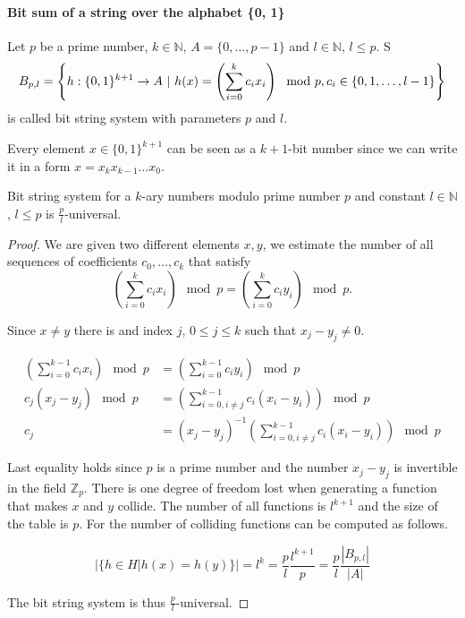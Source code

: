 \paragraph{Bit sum of a string over the alphabet \{0, 1\}}
\begin{definition}
Let $p$ be a prime number, $k \in \mathbb{N}$, $A = \{0, \dots, p - 1 \}$ and $l \in \mathbb{N}$, $l \leq p$. S 
\begin{displaymath}
B_{p, l} = \left\{ h: \{0, 1\}^{k + 1} \rightarrow A \ | \  h(x) = \left(\displaystyle \sum_{i=0}^{k} c_i x_i\right) \mod p, c_i \in \{0, 1, \dots, l - 1\} \right\}
\end{displaymath} 
is called bit string system with parameters $p$ and $l$.
\end{definition}

\begin{remark}
Every element $x \in \{0, 1\}^{k + 1}$ can be seen as a $k + 1$-bit number since we can write it in a form $x = x_k x_{k - 1} \dots x_0$. 
\end{remark}

\begin{remark}
Bit string system for a $k$-ary numbers modulo prime number $p$ and constant $l \in \mathbb{N}$, $l \leq p$ is $\frac{p}{l}$-universal.
\end{remark}
\begin{proof}
We are given two different elements $x, y$, we estimate the number of all sequences of coefficients $c_0, \dots, c_k$ that satisfy
\[
\left( \displaystyle \sum_{i = 0}^{k} c_i x_i \right) \mod p = \left( \displaystyle \sum_{i = 0}^{k} c_i y_i \right) \mod p \textit{.}
\]

Since $x \neq y$ there is and index $j$, $0 \leq j \leq k$ such that $x_j - y_j \neq 0$.

\begin{displaymath}
\begin{split}
\left(\displaystyle \sum_{i=0}^{k-1} c_i x_i\right) \mod p & = \left(\displaystyle \sum_{i=0}^{k-1} c_i y_i\right) \mod p \\
c_j(x_j - y_j) \mod p & = \left(\displaystyle \sum_{i=0, i \neq j}^{k-1} c_i (x_i - y_i)\right) \mod p \\
c_j & = (x_j - y_j) ^ {-1}\left(\displaystyle \sum_{i=0, i \neq j}^{k-1} c_i (x_i - y_i)\right) \mod p
\end{split}
\end{displaymath}

Last equality holds since $p$ is a prime number and the number $x_j - y_j$ is invertible in the field $\mathbb{Z}_p$. There is one degree of freedom lost when generating a function that makes $x$ and $y$ collide. The number of all functions is $l ^ {k + 1}$ and the size of the table is $p$. For the number of colliding functions can be computed as follows.

\begin{displaymath}
|\{h \in H | h(x) = h(y) \}| = l^{k} = \frac{p}{l}\frac{l^{k + 1}}{p} = \frac{p}{l}\frac{|B_{p, l}|}{|A|}
\end{displaymath}

The bit string system is thus $\frac{p}{l}$-universal.
\end{proof}

